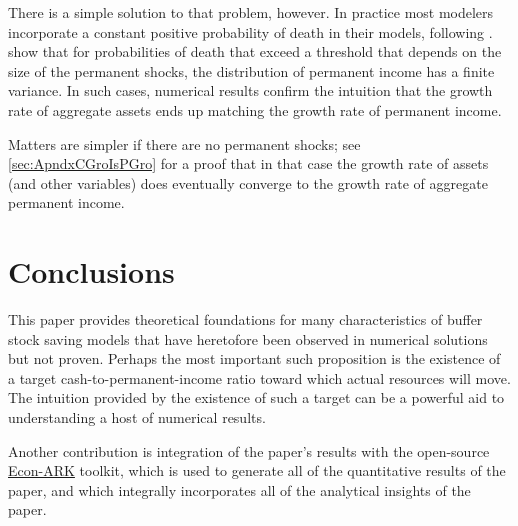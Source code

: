 \documentclass[BufferStockTheory]{subfiles}
\begin{document}
{  There is a simple solution to that problem, however. In practice most modelers incorporate a constant positive probability of death in their models, following \cite{blanchardFinite}.  \cite{cstwMPC} show that for probabilities of death that exceed a threshold that depends on the size of the permanent shocks, the distribution of permanent income has a finite variance.  In such cases, numerical results confirm the intuition that the growth rate of aggregate assets ends up matching the growth rate of permanent income.

  Matters are simpler if there are no permanent shocks; see \ref{sec:ApndxCGroIsPGro} for a proof that in that case the growth rate of assets (and other variables) does eventually converge to the growth rate of aggregate permanent income.

} %

\hypertarget{Conclusions}{}
\section{Conclusions}

This paper provides theoretical foundations for many characteristics
of buffer stock saving models that have heretofore been observed in
numerical solutions but not proven.  Perhaps the most important such
proposition is the existence of a target cash-to-permanent-income
ratio toward which actual resources will move.  The intuition provided by
the existence of such a target can be a powerful aid to understanding a host
of numerical results.

Another contribution is integration of the paper's results with the open-source \href{https://econ-ark.org}{Econ-ARK} toolkit, which is used to generate all of the quantitative results of the paper, and which integrally incorporates all of the analytical insights of the paper.

\clearpage\vfill\eject

\onlyinsubfile{}

\end{document}
